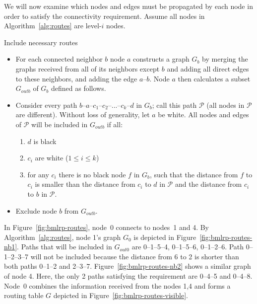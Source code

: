 \documentclass[conference]{IEEEtran}
\theoremstyle{definition}
\newcommand{\cP}{{\mathcal{P}}}
\begin{document}
We will now examine which nodes and edges must be propagated by each node in order to satisfy the connectivity requirement. Assume all nodes in Algorithm~\ref{alg:routes} are level-$i$ nodes.

\begin{algorithm}[H]
    \caption{Include necessary routes}
    \label{alg:routes}
    
    \begin{itemize} 
        \item   For each connected neighbor $b$ node $a$ constructs a graph $G_b$ by merging the graphs received from all of its neighbors except $b$ and adding all direct edges to these neighbors, and adding the edge $a$--$b$. Node $a$ then calculates a subset $G_{outb}$ of $G_b$ defined as follows.

        \item   Consider every path $b$--$a$--$c_1$--$c_2$--...--$c_k$--$d$ in $G_b$; call this path $\cP$ (all nodes in $\cP$ are different). Without loss of generality, let $a$ be white. All nodes and edges of $\cP$ will be included in $G_{outb}$ if all:
        \begin{enumerate}
            \item   $d$ is black
            \item   $c_i$ are white ($1 \le i \le k$)
            \item   for any $c_i$ there is no black node $f$ in $G_b$, such that the distance
                    from $f$ to $c_i$ is smaller than the distance 
                    from $c_i$ to $d$ in $\cP$ and the distance from $c_i$ to $b$ in $\cP$.
        \end{enumerate}

        \item   Exclude node $b$ from $G_{outb}$.
    \end{itemize}
\end{algorithm}

In Figure~\ref{fig:bmlrp-routes}, node~0 connects to nodes~1 and 4. By Algorithm~\ref{alg:routes}, node 1's graph $G_0$ is depicted in Figure~\ref{fig:bmlrp-routes-nb1}. Paths that will be included in $G_{out0}$ are 0--1--5--4, 0--1--5--6, 0--1--2--6. Path 0--1--2--3--7 will not be included because the distance from 6 to 2 is shorter than both paths 0--1--2 and 2--3--7. Figure~\ref{fig:bmlrp-routes-nb2} shows a similar graph of node 4. Here, the only 2 paths satisfying the requirement are 0--4--5 and 0--4--8. Node~0 combines the information received from the nodes 1,4 and forms a routing table $G$ depicted in Figure~\ref{fig:bmlrp-routes-visible}.
\end{document}
